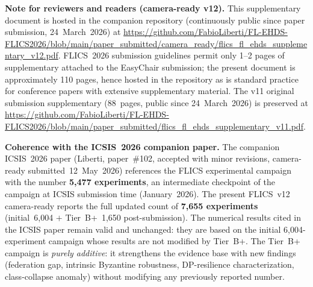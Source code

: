 \documentclass[conference]{IEEEtran}
\begin{document}
\begin{abstract}
(6{,}004 initial $+$ 1{,}650 Tier B+). The open-source reference implementation ($\sim$40K lines, 159 modules) is available at \url{https://github.com/FabioLiberti/FL-EHDS-FLICS2026}.
\end{abstract}

\bigskip

\noindent\textbf{Note for reviewers and readers (camera-ready v12).} This supplementary document is hosted in the companion repository (continuously public since paper submission, 24~March~2026) at \url{https://github.com/FabioLiberti/FL-EHDS-FLICS2026/blob/main/paper_submitted/camera_ready/flics_fl_ehds_supplementary_v12.pdf}. FLICS~2026 submission guidelines permit only 1--2 pages of supplementary attached to the EasyChair submission; the present document is approximately 110 pages, hence hosted in the repository as is standard practice for conference papers with extensive supplementary material. The v11 original submission supplementary (88~pages, public since 24~March~2026) is preserved at \url{https://github.com/FabioLiberti/FL-EHDS-FLICS2026/blob/main/paper_submitted/flics_fl_ehds_supplementary_v11.pdf}.

\smallskip

\noindent\textbf{Coherence with the ICSIS~2026 companion paper.} The companion ICSIS~2026 paper (Liberti, paper~\#102, accepted with minor revisions, camera-ready submitted~12~May~2026) references the FLICS experimental campaign with the number \textbf{5{,}477 experiments}, an intermediate checkpoint of the campaign at ICSIS submission time (January~2026). The present FLICS~v12 camera-ready reports the full updated count of \textbf{7{,}655 experiments} (initial~6{,}004 $+$ Tier~B+~1{,}650 post-submission). The numerical results cited in the ICSIS paper remain valid and unchanged: they are based on the initial 6{,}004-experiment campaign whose results are not modified by Tier~B+. The Tier~B+ campaign is \emph{purely additive}: it strengthens the evidence base with new findings (federation gap, intrinsic Byzantine robustness, DP-resilience characterization, class-collapse anomaly) without modifying any previously reported number.

\makeatletter
\renewcommand*\l@section[2]{%
  \ifnum \c@tocdepth >\z@
    \addpenalty\@secpenalty
    \addvspace{0.6em \@plus\p@}%
    \begingroup
      \parindent\z@ \rightskip\@pnumwidth
      \parfillskip-\@pnumwidth
      \leavevmode\bfseries
      \leftskip\z@
      #1\nobreak\hfill\nobreak\hb@xt@\@pnumwidth{\hss #2}\par
    \endgroup
  \fi}
\renewcommand*\l@subsection{\@dottedtocline{2}{0pt}{2.4em}}
\renewcommand*\l@subsubsection{\@dottedtocline{3}{0pt}{3.0em}}
\makeatother
\end{document}
